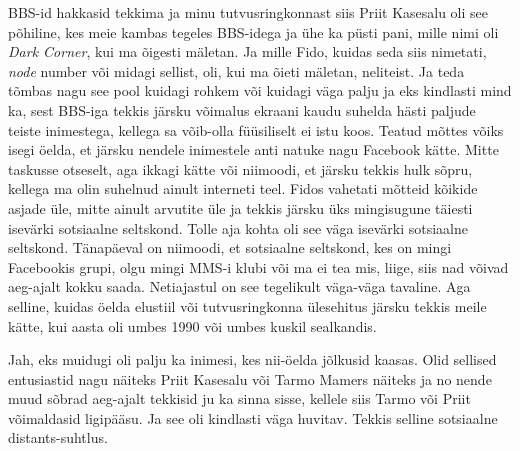 BBS-id hakkasid tekkima ja minu tutvusringkonnast siis Priit 
Kasesalu oli see põhiline, kes meie kambas tegeles 
BBS-idega ja ühe ka püsti pani, mille nimi oli \emph{Dark Corner}, kui ma õigesti mäletan. Ja mille Fido, kuidas seda siis nimetati, 
\emph{node} number või midagi sellist, oli, kui ma õieti mäletan, neliteist. Ja 
teda tõmbas nagu see pool kuidagi rohkem või kuidagi väga palju ja eks 
kindlasti mind ka, sest BBS-iga tekkis järsku  võimalus  ekraani kaudu suhelda 
hästi paljude teiste inimestega, kellega sa võib-olla füüsiliselt ei istu koos. 
Teatud mõttes võiks isegi öelda, et järsku nendele inimestele anti natuke nagu 
Facebook kätte. Mitte taskusse otseselt, aga ikkagi kätte või niimoodi, et 
järsku tekkis hulk sõpru, kellega ma olin suhelnud ainult interneti teel. Fidos vahetati mõtteid  kõikide asjade üle, mitte ainult arvutite üle ja tekkis 
järsku üks mingisugune  täiesti isevärki sotsiaalne seltskond. Tolle aja 
kohta oli see väga isevärki sotsiaalne seltskond. Tänapäeval on niimoodi, et 
sotsiaalne seltskond, kes on mingi Facebookis  grupi, olgu mingi 
MMS-i klubi või ma ei tea mis, liige,  siis nad võivad aeg-ajalt kokku saada. 
Netiajastul on see tegelikult väga-väga tavaline. Aga  selline, kuidas 
öelda elustiil või tutvusringkonna ülesehitus järsku tekkis  meile kätte, kui  
aasta oli umbes 1990 või umbes kuskil sealkandis.


Jah, eks muidugi oli palju ka inimesi, kes nii-öelda jõlkusid kaasas. Olid 
sellised entusiastid nagu näiteks Priit Kasesalu 
või Tarmo Mamers näiteks ja no nende muud sõbrad  
aeg-ajalt tekkisid ju ka sinna sisse, kellele siis  Tarmo või Priit võimaldasid 
ligipääsu. Ja see oli kindlasti väga huvitav. Tekkis selline  sotsiaalne 
distants-suhtlus. 

